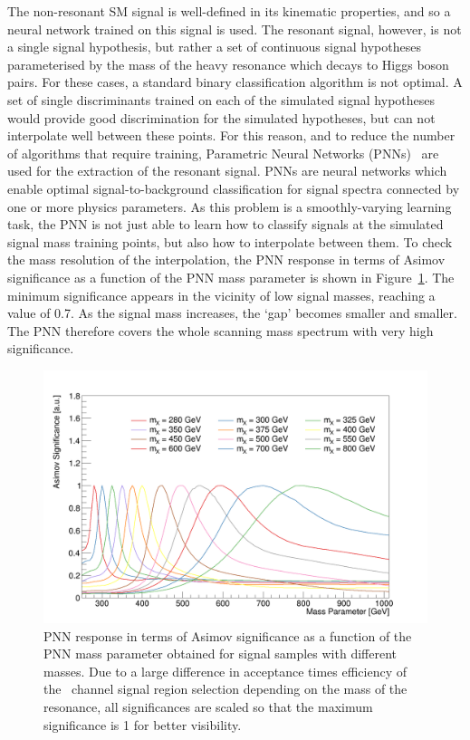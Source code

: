 The non-resonant SM signal is well-defined in its kinematic properties, and so a 
neural network trained on this signal is used.
The resonant signal, however, is not a single signal hypothesis, 
but rather a set of continuous signal hypotheses parameterised by 
the mass of the heavy resonance which decays to Higgs boson pairs.
For these cases, a standard binary classification algorithm is not optimal. 
A set of single discriminants trained on each of the simulated signal hypotheses 
would provide good discrimination for the simulated hypotheses, 
but can not interpolate well between these points. 
For this reason, and to reduce the number of algorithms that require training, 
Parametric Neural Networks (PNNs)~\cite{Baldi:2016fzo} are used 
for the extraction of the resonant signal. PNNs are neural networks 
which enable optimal signal-to-background classification
for signal spectra connected by one or more physics parameters. 
As this problem is a smoothly-varying learning task, 
the PNN is not just able to learn how to classify signals at the simulated signal mass training
points, but also how to interpolate between them. 
To check the mass resolution of the interpolation, 
the PNN response in terms of Asimov significance as a function of the PNN mass
parameter is shown in Figure~\ref{fig:MVA:mass-response}. 
The minimum significance appears in the vicinity of low signal masses, reaching a 
value of 0.7. As the signal mass increases, the `gap' becomes smaller and smaller.
The PNN therefore covers the whole scanning mass spectrum with very high significance. 

\begin{figure}[htbp]
\centering
\includegraphics[width=0.85\linewidth]{DiHiggs/plots/mass_response.png}
\caption{
    PNN response in terms of Asimov significance as a function of the PNN mass parameter obtained for
signal samples with different masses. Due to a large difference in acceptance times
efficiency of the \lephad\ channel signal region selection depending on the mass of the resonance, 
all significances are scaled so that the maximum significance is 1 for better visibility.}
\label{fig:MVA:mass-response}
\end{figure}


